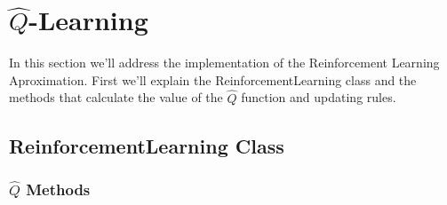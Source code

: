 \section{$ \hat{Q}$-Learning}

In this section we'll address the implementation of the Reinforcement Learning Aproximation. First we'll explain the ReinforcementLearning class and the methods that calculate the value of the $\hat{Q}$ function and updating rules. 

\subsection{ReinforcementLearning Class}









\subsubsection{$ \hat{Q}$ Methods}